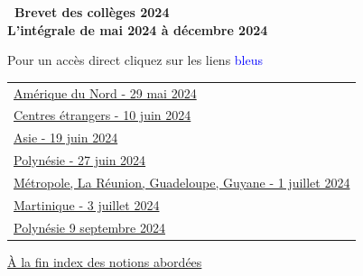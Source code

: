 \documentclass[11pt]{article}
\begin{document}
\setlength\parindent{0mm}

\pagestyle{fancy}
\thispagestyle{empty}
\begin{center} {\Large \textbf{\decofourleft~Brevet des collèges 2024~\decofourright\\\vspace{1cm} L'intégrale de mai 2024 à décembre 2024}}

\vspace{1cm}

Pour un accès direct cliquez sur les liens {\Large \textcolor{blue}{bleus}}
\end{center}

\label{sommaire}
\hypertarget{sommaire}{}

\begin{tabularx}{\linewidth}{>{\Large}X}

\hyperlink{AmeriqueduNord}{Amérique du Nord - 29 mai 2024}\dotfill \pageref{AmeriqueduNord} \\
\hyperlink{Etranger}{Centres étrangers - 10 juin 2024} \dotfill \pageref{Etranger} \\
\hyperlink{Asie}{Asie - 19 juin 2024} \dotfill \pageref{Asie} \\
\hyperlink{Polynesie}{Polynésie - 27 juin 2024} \dotfill \pageref{Polynesie} \\
\hyperlink{Metropole}{Métropole, La Réunion, Guadeloupe, Guyane - 1\up{er} juillet 2024} \dotfill \pageref{Metropole}\\
\hyperlink{Martinique}{Martinique - 3 juillet 2024} \dotfill \pageref{Martinique}\\
\hyperlink{Polynesiesep}{Polynésie 9 septembre 2024} \dotfill \pageref{Polynesiesep} \\
\end{tabularx}

\vspace{1cm}

\hyperlink{Index}{À la fin index des notions abordées}

\newpage
~
\newpage
\end{document}
